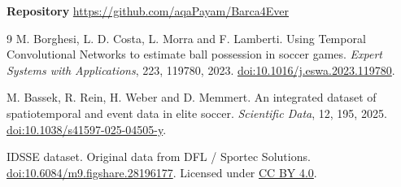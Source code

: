 \documentclass[11pt,a4paper]{article}
\begin{document}
\smallskip
\noindent\textbf{Repository}\quad
\url{https://github.com/aqaPayam/Barca4Ever}

\begin{thebibliography}{9}
\small
{}
M. Borghesi, L. D. Costa, L. Morra and F. Lamberti.
Using Temporal Convolutional Networks to estimate ball possession in soccer
games. \emph{Expert Systems with Applications}, 223, 119780, 2023.
\href{https://doi.org/10.1016/j.eswa.2023.119780}{doi:10.1016/j.eswa.2023.119780}.

M. Bassek, R. Rein, H. Weber and D. Memmert.
An integrated dataset of spatiotemporal and event data in elite soccer.
\emph{Scientific Data}, 12, 195, 2025.
\href{https://doi.org/10.1038/s41597-025-04505-y}{doi:10.1038/s41597-025-04505-y}.

IDSSE dataset. Original data from DFL / Sportec Solutions.
\href{https://doi.org/10.6084/m9.figshare.28196177}{doi:10.6084/m9.figshare.28196177}.
Licensed under \href{https://creativecommons.org/licenses/by/4.0/}{CC BY 4.0}.
\end{thebibliography}
\end{document}
